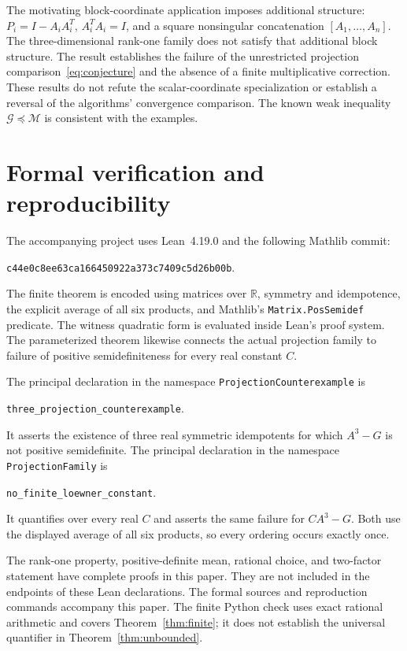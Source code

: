 \documentclass[11pt]{article}
\newcommand{\R}{\mathbb R}
\newcommand{\G}{\mathcal G}
\newcommand{\M}{\mathcal M}
\begin{document}
The motivating block-coordinate application imposes additional structure: $P_i=I-A_iA_i^T$, $A_i^TA_i=I$, and a square nonsingular concatenation $[A_1,\ldots,A_n]$. The three-dimensional rank-one family does not satisfy that additional block structure. The result establishes the failure of the unrestricted projection comparison~\eqref{eq:conjecture} and the absence of a finite multiplicative correction. These results do not refute the scalar-coordinate specialization or establish a reversal of the algorithms' convergence comparison. The known weak inequality $\G\preceq\M$ is consistent with the examples.

\section{Formal verification and reproducibility}

The accompanying project uses Lean~4.19.0 and the following Mathlib commit:
\begin{center}\small\texttt{c44e0c8ee63ca166450922a373c7409c5d26b00b}.\end{center}
The finite theorem is encoded using matrices over $\R$, symmetry and idempotence, the explicit average of all six products, and Mathlib's \texttt{Matrix.PosSemidef} predicate. The witness quadratic form is evaluated inside Lean's proof system. The parameterized theorem likewise connects the actual projection family to failure of positive semidefiniteness for every real constant $C$.

The principal declaration in the namespace \texttt{ProjectionCounterexample} is
\begin{center}\texttt{three\_projection\_counterexample}.\end{center}
It asserts the existence of three real symmetric idempotents for which $A^3-G$ is not positive semidefinite. The principal declaration in the namespace \texttt{ProjectionFamily} is
\begin{center}\texttt{no\_finite\_loewner\_constant}.\end{center}
It quantifies over every real $C$ and asserts the same failure for $CA^3-G$. Both use the displayed average of all six products, so every ordering occurs exactly once.

The rank-one property, positive-definite mean, rational choice, and two-factor statement have complete proofs in this paper. They are not included in the endpoints of these Lean declarations. The formal sources and reproduction commands accompany this paper. The finite Python check uses exact rational arithmetic and covers Theorem~\ref{thm:finite}; it does not establish the universal quantifier in Theorem~\ref{thm:unbounded}.
\end{document}
